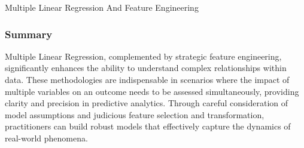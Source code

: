 \begin{notes}{Multiple Linear Regression And Feature Engineering}
    \subsubsection*{Summary}
    
    Multiple Linear Regression, complemented by strategic feature engineering, significantly enhances the ability to understand complex relationships within data. These methodologies are indispensable 
    in scenarios where the impact of multiple variables on an outcome needs to be assessed simultaneously, providing clarity and precision in predictive analytics. Through careful consideration of 
    model assumptions and judicious feature selection and transformation, practitioners can build robust models that effectively capture the dynamics of real-world phenomena.    
\end{notes}